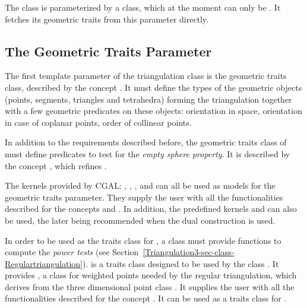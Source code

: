 The class  is parameterized by a class, which at
the moment can only be .  It fetches its
geometric traits from this parameter directly.

\subsection{The Geometric Traits Parameter}
\label{Triangulation3-sec-Traits}

The first template parameter of the triangulation class
is the geometric traits class, described by the concept
.  It must define the types of the geometric objects
(points, segments, triangles and tetrahedra) forming the triangulation together
with a few geometric predicates on these objects: orientation in space,
orientation in case of coplanar points, order of collinear points.

In addition to the requirements described before, the geometric traits
class of  must define predicates to test for the
\textit{empty sphere property}.  It is described by the concept
, which refines .

The kernels provided by CGAL: , ,
,  and
 can all be used as models for the geometric traits
parameter.
They supply the user with all the functionalities described for the concepts
 and
.
In addition, the predefined kernels
 and
can also be used, the later being recommended when the dual construction is
used.

In order to be used as the traits class for ,
a class must provide functions to compute the \textit{power tests}
(see Section~\ref{Triangulation3-sec-class-Regulartriangulation}).
 is a traits class 
 designed to be used by the class
. It provides
, a class for weighted points
needed by the regular triangulation, which derives from the three dimensional
point class .
It supplies the user with all the functionalities 
described for the concept . 
It can be used as a traits class for
.

